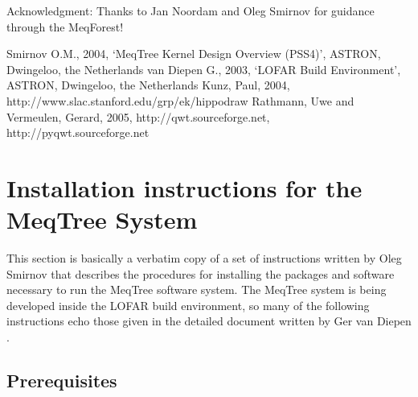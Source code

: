 \documentclass[10pt]{article}
\begin{document}
\vspace{1.0cm}                         
Acknowledgment: Thanks to Jan Noordam and Oleg Smirnov for guidance through 
the MeqForest!

\begin{thebibliography}{}
 Smirnov O.M., 2004, `MeqTree Kernel Design Overview (PSS4)',
ASTRON, Dwingeloo, the Netherlands
 van Diepen G., 2003, `LOFAR Build Environment',
ASTRON, Dwingeloo, the Netherlands
 Kunz, Paul, 2004, http://www.slac.stanford.edu/grp/ek/hippodraw
 Rathmann, Uwe and Vermeulen, Gerard, 2005, http://qwt.sourceforge.net, http://pyqwt.sourceforge.net
\end{thebibliography}
 

\section {Installation instructions for the MeqTree System}
This section is basically a verbatim copy of a set of instructions
written by Oleg Smirnov that describes the procedures for installing the 
packages and software necessary to run the MeqTree software system.
The MeqTree system is being developed inside the LOFAR build environment,
so many of the following instructions echo those given in the detailed
document written by Ger van Diepen \cite{diepen}.

\subsection{Prerequisites} 
  
\end{document}
